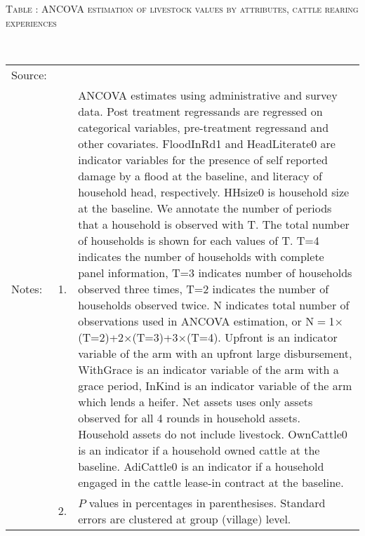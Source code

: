 \vspace{-1cm}\hspace{-1cm}\begin{minipage}[t]{14cm}
\hfil\textsc{\normalsize Table \thetable: ANCOVA estimation of livestock values by attributes, cattle rearing experiences\label{tab ANCOVA Livestock Experience attributes}}\\
\setlength{\tabcolsep}{1pt}
\setlength{\baselineskip}{8pt}
\renewcommand{\arraystretch}{.52}
\hfil{}\\
\renewcommand{\arraystretch}{.8}
\setlength{\tabcolsep}{1pt}
\begin{tabular}{>{\hfill\scriptsize}p{1cm}<{}>{\hfill\scriptsize}p{.25cm}<{}>{\scriptsize}p{12cm}<{\hfill}}
Source:& \multicolumn{2}{l}{\scriptsize Estimated with GUK administrative and survey data.}\\
Notes: & 1. & ANCOVA estimates using administrative and survey data. Post treatment regressands are regressed on categorical variables, pre-treatment regressand and other covariates. \textsf{FloodInRd1} and \textsf{HeadLiterate0} are indicator variables for the presence of self reported damage by a flood at the baseline, and literacy of household head, respectively. \textsf{HHsize0} is household size at the baseline. We annotate the number of periods that a household is observed with \textsf{T}. The total number of households is shown for each values of \textsf{T}. \textsf{T=4} indicates the number of households with complete panel information, \textsf{T=3} indicates number of households observed three times, \textsf{T=2} indicates the number of households observed twice. \textsf{N} indicates total number of observations used in ANCOVA estimation, or \textsf{N$=$1$\times$(T=2)+2$\times$(T=3)+3$\times$(T=4)}.  \textsf{Upfront} is an indicator variable of the arm with an upfront large disbursement, \textsf{WithGrace} is an indicator variable of the arm with a grace period, \textsf{InKind} is an indicator variable of the arm which lends a heifer. Net assets uses only assets observed for all 4 rounds in household assets. Household assets do not include livestock. \textsf{OwnCattle0} is an indicator if a household owned cattle at the baseline. \textsf{AdiCattle0} is an indicator if a household engaged in the cattle lease-in contract at the baseline.  \\
& 2. & $P$ values in percentages in parenthesises. Standard errors are clustered at group (village) level.
\end{tabular}
\end{minipage}

